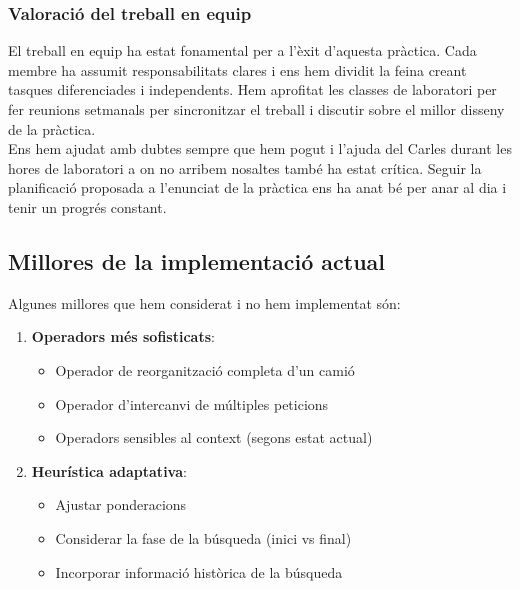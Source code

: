 \subsubsection{Valoració del treball en equip}

El treball en equip ha estat fonamental per a l'èxit d'aquesta pràctica. Cada membre ha assumit responsabilitats clares i ens hem dividit la feina creant tasques diferenciades i independents. Hem aprofitat les classes de laboratori per fer reunions setmanals per sincronitzar el treball i discutir sobre el millor disseny de la pràctica. \\

Ens hem ajudat amb dubtes sempre que hem pogut i l'ajuda del Carles durant les hores de laboratori a on no arribem nosaltes també ha estat crítica. 
Seguir la planificació proposada a l'enunciat de la pràctica ens ha anat bé per anar al dia i tenir un progrés constant.

\subsection{Millores de la implementació actual}
Algunes millores que hem considerat i no hem implementat són:

\begin{enumerate}
    \item \textbf{Operadors més sofisticats}:
    \begin{itemize}
        \item Operador de reorganització completa d'un camió
        \item Operador d'intercanvi de múltiples peticions
        \item Operadors sensibles al context (segons estat actual)
    \end{itemize}
    
    \item \textbf{Heurística adaptativa}:
    \begin{itemize}
        \item Ajustar ponderacions
        \item Considerar la fase de la búsqueda (inici vs final)
        \item Incorporar informació històrica de la búsqueda
    \end{itemize}
\end{enumerate}


